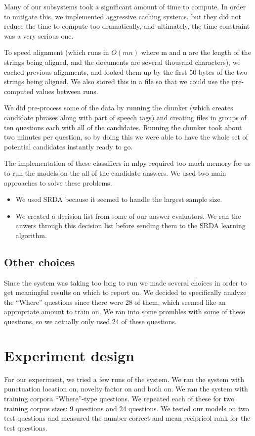 \documentclass{article}
\begin{document}
Many of our subsystems took a significant amount of time to compute.  In order
to mitigate this, we implemented aggressive caching systems, but they did not
reduce the time to compute too dramatically, and ultimately, the time constraint
was a very serious one.

To speed alignment (which runs in $O(mn)$ where m and n are the length of the strings being aligned, and the documents are several thousand characters), we cached previous alignments, and looked them up by the first 50 bytes of the two strings being aligned.  We also stored this in a file so that we could use the pre-computed values between runs.

We did pre-process some of the data by running the chunker (which creates
candidate phrases along with part of speech tags) and creating files in
groups of ten questions each with all of the candidates. Running the chunker
took about two minutes per question, so by doing this we were able to have
the whole set of potential candidates instantly ready to go.

The implementation of these classifiers in mlpy required too much memory for
us to run the models on the all of the candidate answers. We used two main approaches
to solve these problems.
\begin{itemize}
\item We used SRDA because it seemed to handle the largest sample size.
\item We created a decision list from some of our answer evaluators. We ran the anwers
through this decision list before sending them to the SRDA learning algorithm.
\end{itemize}

\subsection{Other choices}
Since the system was taking too long to run we made several choices in order
to get meaningful results on which to report on. We decided to specifically analyze
the ``Where'' questions since there were 28 of them, which seemed like an appropriate
amount to train on. We ran into some prombles with some of these questions, so we
actually only used 24 of these questions. 

\section{Experiment design}
For our experiment, we tried a few runs of the system. We ran the system with
punctuation location on, novelty factor on and both on.
We ran the system with training corpora ``Where''-type questions.
We repeated each of these for two training corpus sizes: 9 questions and 24 questions.
We tested our models on two test questions and measured the number correct and
mean recipricol rank for the test questions.
\end{document}
